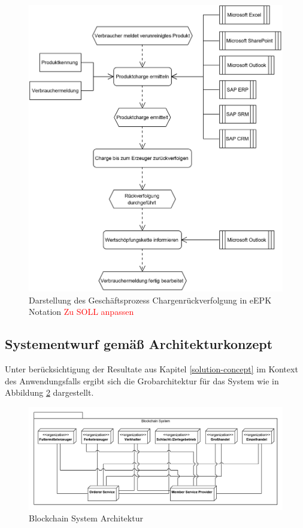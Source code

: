 \begin{figure}[H]
	\centering
	\includegraphics[width=1\linewidth]{pictures/business-process-epc-diagram-bw}
	\caption[Darstellung des Geschäftsprozess Chargenrückverfolgung in eEPK Notation]{Darstellung des Geschäftsprozess Chargenrückverfolgung in eEPK Notation \textcolor{red}{Zu SOLL anpassen}}
	\label{fig:target-business-process}
\end{figure}

\subsection{Systementwurf gemäß Architekturkonzept}\label{system-design-concept}
Unter berücksichtigung der Resultate aus Kapitel \ref{solution-concept} im Kontext des Anwendungsfalls ergibt sich die Grobarchitektur für das System wie in Abbildung \ref{fig:blockchain-system-architecture} dargestellt.

\begin{figure}[H]
	\centering
	\includegraphics[width=1\linewidth]{pictures/blockchain-system-deployment-diagram}
	\caption[Blockchain System Architektur]{Blockchain System Architektur}
	\label{fig:blockchain-system-architecture}
\end{figure}

